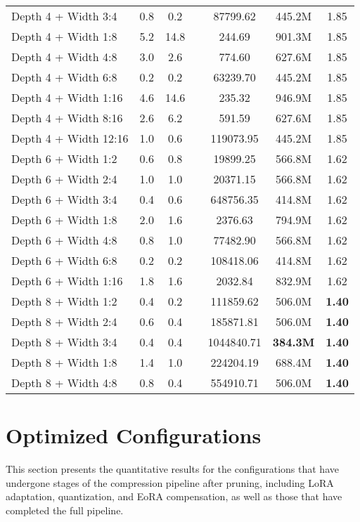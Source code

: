 {\begin{longtable}{lcccccc}
Depth 4 + Width 3:4 & 0.8 & 0.2 & & 87799.62 & 445.2M & 1.85 \\
Depth 4 + Width 1:8 & 5.2 & 14.8 & & 244.69 & 901.3M & 1.85 \\
Depth 4 + Width 4:8 & 3.0 & 2.6 & & 774.60 & 627.6M & 1.85 \\
Depth 4 + Width 6:8 & 0.2 & 0.2 & & 63239.70 & 445.2M & 1.85 \\
Depth 4 + Width 1:16 & 4.6 & 14.6 & & 235.32 & 946.9M & 1.85 \\
Depth 4 + Width 8:16 & 2.6 & 6.2 & & 591.59 & 627.6M & 1.85 \\
Depth 4 + Width 12:16 & 1.0 & 0.6 & & 119073.95 & 445.2M & 1.85 \\
Depth 6 + Width 1:2 & 0.6 & 0.8 & & 19899.25 & 566.8M & 1.62 \\
Depth 6 + Width 2:4 & 1.0 & 1.0 & & 20371.15 & 566.8M & 1.62 \\
Depth 6 + Width 3:4 & 0.4 & 0.6 & & 648756.35 & 414.8M & 1.62 \\
Depth 6 + Width 1:8 & 2.0 & 1.6 & & 2376.63 & 794.9M & 1.62 \\
Depth 6 + Width 4:8 & 0.8 & 1.0 & & 77482.90 & 566.8M & 1.62 \\
Depth 6 + Width 6:8 & 0.2 & 0.2 & & 108418.06 & 414.8M & 1.62 \\
Depth 6 + Width 1:16 & 1.8 & 1.6 & & 2032.84 & 832.9M & 1.62 \\
Depth 8 + Width 1:2 & 0.4 & 0.2 & & 111859.62 & 506.0M &  \textbf{1.40} \\
Depth 8 + Width 2:4 & 0.6 & 0.4 & & 185871.81 & 506.0M &  \textbf{1.40} \\
Depth 8 + Width 3:4 & 0.4 & 0.4 & & 1044840.71 & \textbf{384.3M} & \textbf{1.40} \\
Depth 8 + Width 1:8 & 1.4 & 1.0 & & 224204.19 & 688.4M &  \textbf{1.40} \\
Depth 8 + Width 4:8 & 0.8 & 0.4 & & 554910.71 & 506.0M &  \textbf{1.40} \\
\end{longtable}
}
\normalsize

\section{Optimized Configurations} \label{app:appendix1_optimized}

This section presents the quantitative results for the configurations that have undergone stages of the compression pipeline after pruning, including LoRA adaptation, quantization, and EoRA compensation, as well as those that have completed the full pipeline.

